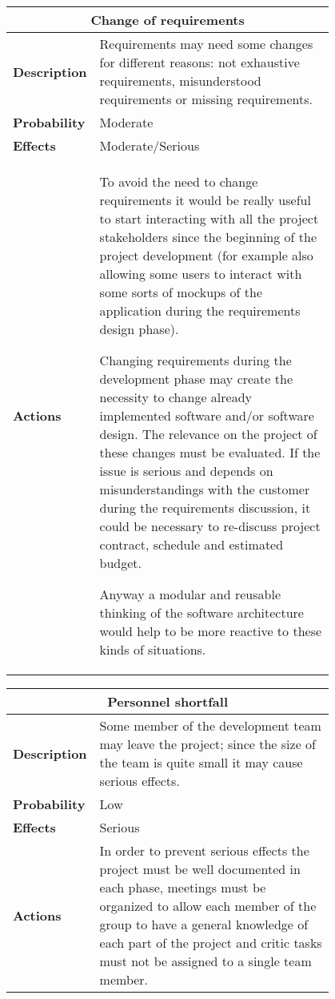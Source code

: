 \begin{longtable}{lp{0.8\linewidth}}
\multicolumn{2}{c}{\textbf{Change of requirements}}\\
\toprule
\textbf{Description}& Requirements may need some changes for different reasons: not exhaustive requirements, misunderstood requirements or missing requirements. \\
\midrule
\textbf{Probability}&Moderate\\
\midrule
\textbf{Effects}&Moderate/Serious\\
\midrule
\textbf{Actions}& To avoid the need to change requirements it would be really useful to start interacting with all the project stakeholders since the beginning of the project development (for example also allowing some users to interact with some sorts of mockups of the application during the requirements design phase). 

Changing requirements during the development phase may create the necessity to change already implemented software and/or software design. The relevance on the project of these changes must be evaluated. If the issue is serious and depends on misunderstandings with the customer during the requirements discussion, it could be necessary to re-discuss project contract, schedule and estimated budget. 

Anyway a modular and reusable thinking of the software architecture would help to be more reactive to these kinds of situations.\\
\bottomrule
\end{longtable}

\begin{longtable}{lp{0.8\linewidth}}
\multicolumn{2}{c}{\textbf{Personnel shortfall}}\\
\toprule
\textbf{Description}& Some member of the development team may leave the project; since the size of the team is quite small it may cause serious effects. \\
\midrule
\textbf{Probability}&Low\\
\midrule
\textbf{Effects}&Serious\\
\midrule
\textbf{Actions}& In order to prevent serious effects the project must be well documented in each phase, meetings must be organized to allow each member of the group to have a general knowledge of each part of the project and critic tasks must not be assigned to a single team member.\\
\bottomrule
\end{longtable}


